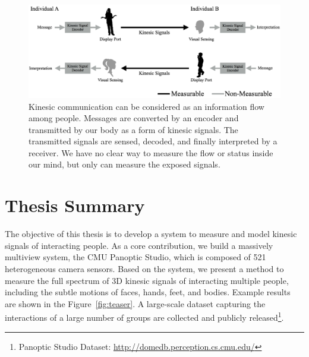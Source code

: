 


\begin{figure}[t]
	\centering
	\includegraphics[trim=0 0 0 0, clip=true, width=\textwidth]{figures/kinesicflow2}
	\caption{Kinesic communication can be considered as an information flow among people. Messages are converted by an encoder and transmitted by our body as a form of kinesic signals. The transmitted signals are sensed, decoded, and finally interpreted by a receiver. We have no clear way to measure the flow or status inside our mind, but only can measure the exposed signals.}	
	\label{fig:kinesicflow}
\end{figure}


\section{Thesis  Summary}

The objective of this thesis is to develop a system to measure and model kinesic signals of interacting people. As a core contribution, we build a massively multiview system, the CMU Panoptic Studio, which is composed of 521 heterogeneous camera sensors. Based on the system, we present a method to measure the full spectrum of 3D kinesic signals of interacting multiple people, including the subtle motions of faces, hands, feet, and bodies. Example results are shown in the Figure~\ref{fig:teaser}. A large-scale dataset capturing the interactions of a large number of groups are collected and publicly released\footnote{Panoptic Studio Dataset: \url{http://domedb.perception.cs.cmu.edu/}}.

